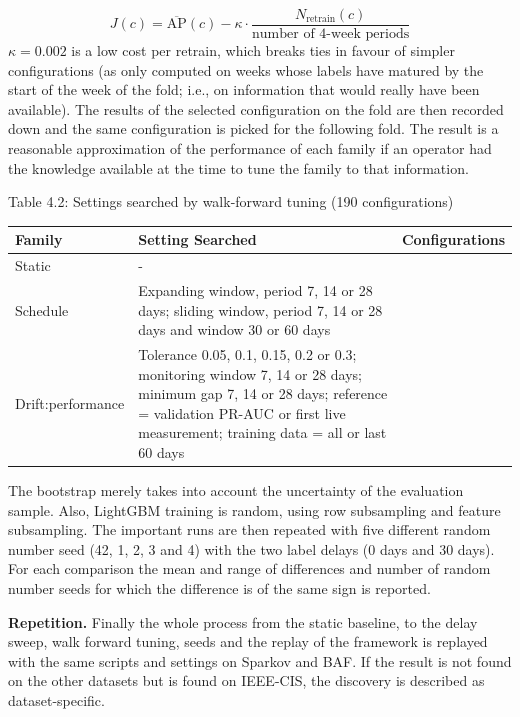 \documentclass[11pt,letterpaper]{report}
\begin{document}
\begin{equation*}
  J(c) = \overline{\mathrm{AP}}(c) - \kappa \cdot \frac{N_{\mathrm{retrain}}(c)}{\text{number of 4-week periods}} \tag{4.6}
\end{equation*}
$\kappa = 0.002$ is a low cost per retrain, which breaks ties in favour of simpler configurations (as only computed on weeks whose labels have matured by the start of the week of the fold; i.e., on information that would really have been available). The results of the selected configuration on the fold are then recorded down and the same configuration is picked for the following fold. The result is a reasonable approximation of the performance of each family if an operator had the knowledge available at the time to tune the family to that information.

\begin{center}\small Table 4.2: Settings searched by walk-forward tuning (190 configurations)\end{center}
\vspace{-1.2em}

{\small
\begin{longtable}{|>{\raggedright\arraybackslash}p{}|>{\raggedright\arraybackslash}p{}|>{\raggedright\arraybackslash}p{}|}
\hline
Family & Setting Searched & Configurations \\ \hline
Static & - & 1 \\ \hline
Schedule & Expanding window, period 7, 14 or 28 days; sliding window, period 7, 14 or 28 days and window 30 or 60 days & 9 \\ \hline
Drift:performance & Tolerance 0.05, 0.1, 0.15, 0.2 or 0.3; monitoring window 7, 14 or 28 days; minimum gap 7, 14 or 28 days; reference = validation PR-AUC or first live measurement; training data = all or last 60 days & 180 \\ \hline
\end{longtable}
}

The bootstrap merely takes into account the uncertainty of the evaluation sample. Also, LightGBM training is random, using row subsampling and feature subsampling. The important runs are then repeated with five different random number seed (42, 1, 2, 3 and 4) with the two label delays (0 days and 30 days). For each comparison the mean and range of differences and number of random number seeds for which the difference is of the same sign is reported.

\textbf{Repetition.} Finally the whole process from the static baseline, to the delay sweep, walk forward tuning, seeds and the replay of the framework is replayed with the same scripts and settings on Sparkov and BAF. If the result is not found on the other datasets but is found on IEEE-CIS, the discovery is described as dataset-specific.
\end{document}
